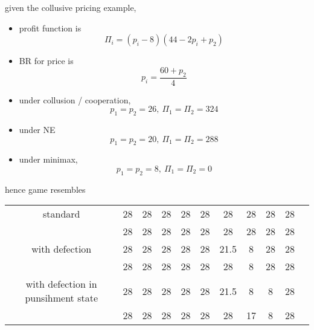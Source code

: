 \documentclass[a4paper, 10pt]{article}
\begin{document}
given the collusive pricing example, 
\begin{itemize}
   \item profit function is
      \[
         \Pi_i = (p_i - 8)(44 - 2p_i +p_2)
      \]
   \item BR for price is
      \[
         p_i = \frac{60 + p_2}{4}
      \]
   \item under collusion / cooperation, 
      \[
      p_1 = p_2 = 26, \ \Pi_1 = \Pi_2 = 324
      \]
   \item under NE 
      \[
      p_1 = p_2 = 20, \ \Pi_1 = \Pi_2 = 288
      \]
   \item under minimax, 
      \[
      p_1 = p_2 = 8, \ \Pi_1 = \Pi_2 = 0
      \]
\end{itemize}	
hence game resembles
\begin{center}
   \begin{tabular}{c |c c c c c c c c c c}
      standard & 28 & 28& 28& 28& 28& 28& 28& 28& 28 \\
               & 28 & 28& 28& 28& 28& 28& 28& 28& 28 \\
     \hline
      with defection & 28 & 28& 28& 28& 28& 21.5& 8& 28& 28 \\
                     & 28 & 28& 28& 28& 28& 28& 8& 28& 28 \\
     \hline
      with defection in punsihment state 
                     & 28 & 28& 28& 28& 28& 21.5& 8& 8& 28 \\
                     & 28 & 28& 28& 28& 28& 28& 17& 8& 28 \\
   \end{tabular}
\end{center}  
      
\end{document}

